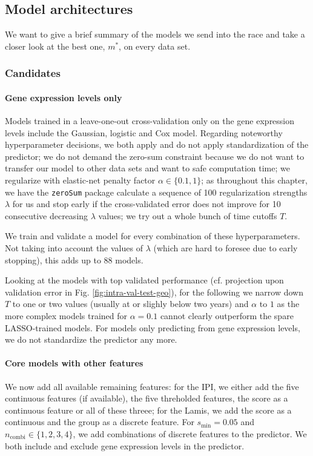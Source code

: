 

\subsection{Model architectures}

We want to give a brief summary of the models we send into the race and take a closer look at the 
best one, $m^*$, on every data set.

\subsubsection{Candidates}

\paragraph{Gene expression levels only}
Models trained in a leave-one-out cross-validation only on the gene expression levels include the 
Gaussian, logistic and Cox model. Regarding noteworthy hyperparameter decisions, we both apply and 
do not apply standardization of the predictor; we do not demand the zero-sum constraint 
because we do not want to transfer our model to other data sets and want to safe computation time;
we regularize with elastic-net penalty factor $\alpha \in \{ \num{0.1}, 1 \}$; as throughout this 
chapter, we have the \texttt{zeroSum} package calculate a sequence of \num{100} regularization strengths 
$\lambda$ for us and stop early if the cross-validated error does not improve for \num{10} 
consecutive decreasing $\lambda$ values; we try out a whole bunch of time cutoffs $T$.

We train and validate a model for every combination of these hyperparameters.
Not taking into account the values of $\lambda$ (which are hard to foresee due to early stopping), 
this adds up to \num{88} models.

Looking at the models with top validated performance (cf. projection upon validation error in Fig. 
\ref{fig:intra-val-test-geo}), for the following we narrow down $T$ to one or 
two values (usually at or slighly below two years) and $\alpha$ to $1$ as the more complex models 
trained for $\alpha = \num{0.1}$ cannot clearly outperform the spare LASSO-trained models. For 
models only predicting from gene expression levels, we do not standardize the predictor any more.

\paragraph{Core models with other features}
We now add all available remaining features: for the 
IPI, we either add the five continuous features (if available), the five threholded features, the 
score as a continuous feature or all of these threee; for the Lamis, %
we add the score as a continuous and the group as a discrete feature. For $s_\text{min} = \num{0.05}$ 
and $n_\text{combi} \in \{1, 2, 3, 4 \}$, we add combinations of discrete features to the predictor. 
We both include and exclude gene expression levels in the predictor.

